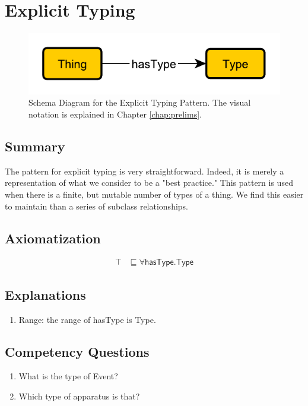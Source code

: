 \section{Explicit Typing}
\label{sec:Explicit}
\begin{figure}[h!]
\begin{center}
\includegraphics[width=.7\textwidth]{figures/explicit}
\end{center}
\caption{Schema Diagram for the Explicit Typing Pattern. The visual notation is explained in Chapter \ref{chap:prelims}.}
\label{fig:Explicit}
\end{figure}
\subsection{Summary}
\label{sum:Explicit}
The pattern for explicit typing is very straightforward. Indeed, it is merely a representation of what we consider to be a "best practice." This pattern is used when there is a finite, but mutable number of types of a thing. We find this easier to maintain than a series of subclass relationships.

\subsection{Axiomatization}
\label{axs:Explicit}
\begin{align}
\top &\sqsubseteq \forall\textsf{hasType.Type}  
\end{align}

\subsection{Explanations}
\label{exp:Explicit}
\begin{enumerate}
\item Range: the range of \textsf{hasType} is \textsf{Type}.
\end{enumerate}

\subsection{Competency Questions}
\label{cqs:Explicit}
\begin{enumerate}[CQ1.]
\item What is the type of Event?
\item Which type of apparatus is that?
\end{enumerate}

\newpage
